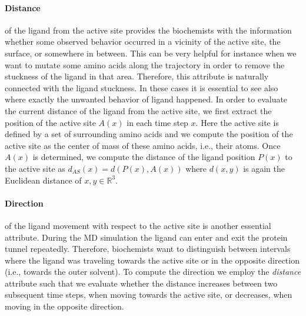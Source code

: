 \documentclass[twocolumn]{bmcart}%
\begin{document}
\paragraph{\textbf{Distance}} of the ligand from the active site provides the biochemists with the information whether some observed behavior occurred in a vicinity of the active site, the surface, or somewhere in between. 
This can be very helpful for instance when we want to mutate some amino acids along the trajectory in order to remove the stuckness of the ligand in that area. 
Therefore, this attribute is naturally connected with the ligand stuckness.
In these cases it is essential to see also where exactly the unwanted behavior of ligand happened.
In order to evaluate the current distance of the ligand from the active site, we first extract the position of the active site $A(x)$ in each time step $x$. 
Here the active site is defined by a set of surrounding amino acids and we compute the position of the active site as the center of mass of these amino acids, i.e., their atoms. 
Once $A(x)$ is determined, we compute the distance of the ligand position $P(x)$ to the active site as $d_{AS}(x) = d(P(x), A(x))$ where $d(x, y)$ is again the Euclidean distance of $x, y \in \mathbb{R}^3$.

\paragraph{\textbf{Direction}} of the ligand movement with respect to the active site is another essential attribute. 
During the MD simulation the ligand can enter and exit the protein tunnel repeatedly. 
Therefore, biochemists want to distinguish between intervals where the ligand was traveling towards the active site or in the opposite direction (i.e., towards the outer solvent). 
To compute the direction we employ the \textit{distance} attribute such that we evaluate whether the distance increases between two subsequent time steps, when moving towards the active site, or decreases, when moving in the opposite direction.
\end{document}
